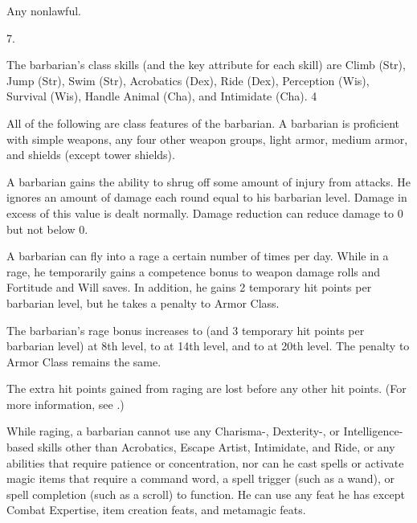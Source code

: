  Any nonlawful.

 7.

The barbarian's class skills (and the key attribute for each skill) are
Climb (Str), Jump (Str), Swim (Str), Acrobatics (Dex), Ride (Dex), Perception (Wis), Survival (Wis), Handle Animal (Cha), and Intimidate (Cha).
 4


All of the following are class features of the barbarian.
  A barbarian is proficient with simple weapons, any four other weapon groups, light armor, medium armor, and shields (except tower shields).

 A barbarian gains the ability to shrug off some amount of injury from attacks. He ignores an amount of damage each round equal to his barbarian level. Damage in excess of this value is dealt normally. Damage reduction can reduce damage to 0 but not below 0.

\begin{comment}
\cf{Bbn}{Illiteracy} Barbarians are the only characters who do not
automatically know how to read and write. A barbarian may spend a skill point to gain the ability to read and write all languages he is able to speak.
A barbarian who gains a level in any other class automatically gains literacy. Any other
character who gains a barbarian level does not lose the literacy he or she already had.
\end{comment}

 A barbarian can fly into a rage a certain number of times per day. While in a rage, he temporarily gains a  competence bonus to weapon damage rolls and Fortitude and Will saves. In addition, he gains 2 temporary hit points per barbarian level, but he takes a  penalty to Armor Class.
\par The barbarian's rage bonus increases to  (and 3 temporary hit points per barbarian level) at 8th level, to  at 14th level, and to  at 20th level. The penalty to Armor Class remains the same.
\par The extra hit points gained from raging are lost before any other hit points. (For more information, see .)

While raging, a barbarian
cannot use any Charisma-, Dexterity-, or Intelligence-based
skills other than Acrobatics, Escape Artist, Intimidate, and
Ride, or any abilities that require
patience or concentration, nor can he cast spells or activate
magic items that require a command word, a spell trigger (such as a wand), or spell
completion (such as a scroll) to function. He can use any feat he has except Combat Expertise, item creation feats, and metamagic feats.

